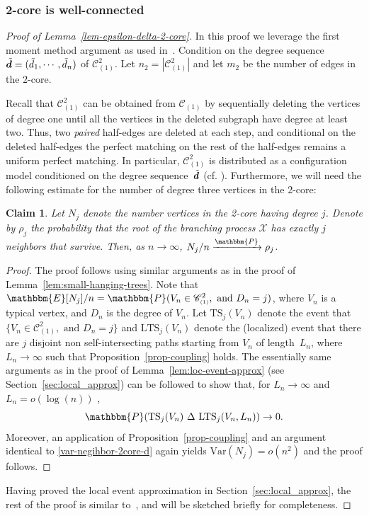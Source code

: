 \documentclass[11pt,a4paper, reqno]{article}
\numberwithin{equation}{section}
\numberwithin{equation}{section}
\def\sss{\scriptscriptstyle}
\newcommand*{\Mtilde}[1]{\skew{5}{\tilde}{#1}}
\newcommand{\var}[1]{\ensuremath{\mathrm{Var}\left(#1\right)}}
\newcommand{\pto}{\ensuremath{\xrightarrow{\mathbbm{P}}}}
\newcommand{\PR}{\ensuremath{\mathbbm{P}}}
\newcommand{\E}{\ensuremath{\mathbbm{E}}}
\newcommand{\1}{\ensuremath{\mathbbm{1}}}
\newcommand{\bld}[1]{\boldsymbol{#1}}
\newcommand{\C}{\mathscr{C}_{\sss (1)}}
\newtheorem{claim}{Claim}
\newenvironment{claimproof}{\begin{proof}\renewcommand{\qedsymbol}{\claimqed}}{\end{proof}\renewcommand{\qedsymbol}{\plainqed}}
\let\plainqed\qedsymbol
\newcommand{\claimqed}{$\lrcorner$}
\numberwithin{equation}{section}
\numberwithin{theorem}{section}
\begin{document}
\subsubsection{2-core is well-connected}
\begin{proof}[Proof of Lemma~\ref{lem-epsilon-delta-2-core}]
In this proof we leverage the first moment method argument as used in~\cite{BJR07}. 
Condition on the degree sequence 
$\Mtilde{\bld{d}} = (\tilde{d}_1, \cdots, \tilde{d}_n)$ of $\mathscr{C}_{\sss (1)}^2$.  
Let $n_2 = |\mathscr{C}_{\sss (1)}^2|$ and let $m_2$  be the number of edges in the $2$-core. 

Recall that $\mathscr{C}_{\sss(1)}^2$ can be obtained from $\mathscr{C}_{\sss (1)}$ by sequentially deleting the vertices of degree one until all the vertices in the deleted subgraph have degree at least two. 
Thus, two \emph{paired} half-edges are deleted at each step, and conditional on the deleted half-edges the perfect matching on the rest of the half-edges remains a uniform perfect matching. 
In particular, $\mathscr{C}_{\sss (1)}^2$ is distributed as a configuration model conditioned on the degree sequence~$\Mtilde{\bld{d}}$ (cf. \cite[Section~3]{JL07}).
Furthermore, we will need the following estimate for the number of degree three vertices in the 2-core:
\begin{claim}\label{claim:deg-dist-2core}
Let $N_j$ denote the number vertices in the 2-core having degree $j$. Denote by $\rho_j$ the probability that the root of the branching process  $\mathcal{X}$ has exactly $j$ neighbors that survive. Then, as $n\to\infty$, $N_j/n\pto \rho_j$.
\end{claim}
\begin{claimproof}
The proof follows using similar arguments as in the proof of Lemma~\ref{lem:small-hanging-trees}. Note that $\E[N_j]/n = \PR(V_n\in \C^2, \text{ and }D_n = j)$, where $V_n$ is a typical vertex, and $D_n$ is the degree of $V_n$. 
Let $\mathrm{TS}_j(V_n)$ denote the event that $\{V_n\in \C^2, \text{ and }D_n = j\}$ and $\mathrm{LTS}_j(V_n)$ denote the (localized) event that there are $j$ disjoint non self-intersecting  paths starting from $V_n$ of length~$L_n$, where $L_n \to\infty$ such that Proposition~\ref{prop-coupling} holds. 
The essentially  same arguments as in the proof of Lemma~\ref{lem:loc-event-approx} (see Section~\ref{sec:local_approx}) can be followed to show that, for $L_n\to\infty$ and  $L_n = o(\log(n))$ ,
\begin{equation}
\PR(\mathrm{TS}_j(V_n)\ \Delta\ \mathrm{LTS}_j(V_n,L_n))\to 0.
\end{equation}
Moreover, an application of Proposition~\ref{prop-coupling} and an argument identical
to \eqref{var-negihbor-2core-d} again yields $\var{N_j}=o(n^2)$ and the proof follows.
\end{claimproof}
\noindent
Having proved the local event approximation in Section~\ref{sec:local_approx}, the rest of the proof is similar to~\cite{BJR07}, and will be sketched briefly for completeness. 


\end{proof}
\end{document}
